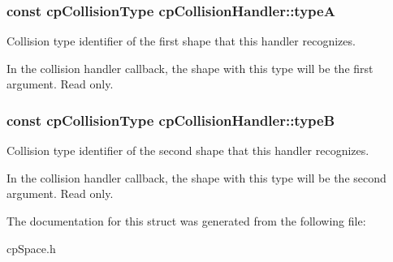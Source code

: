 \subsubsection[{type\+A}]{\setlength{\rightskip}{0pt plus 5cm}const {\bf cp\+Collision\+Type} cp\+Collision\+Handler\+::type\+A}\label{structcp_collision_handler_a07bbc9d26af9d41cc87bae6514930d9f}


Collision type identifier of the first shape that this handler recognizes. 

In the collision handler callback, the shape with this type will be the first argument. Read only. \hypertarget{structcp_collision_handler_a7f9def10b179d18de37bec5b3c6d8621}{}
\subsubsection[{type\+B}]{\setlength{\rightskip}{0pt plus 5cm}const {\bf cp\+Collision\+Type} cp\+Collision\+Handler\+::type\+B}\label{structcp_collision_handler_a7f9def10b179d18de37bec5b3c6d8621}


Collision type identifier of the second shape that this handler recognizes. 

In the collision handler callback, the shape with this type will be the second argument. Read only. 

The documentation for this struct was generated from the following file\+:\begin{DoxyCompactItemize}
\item 
cp\+Space.\+h\end{DoxyCompactItemize}
